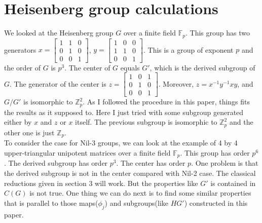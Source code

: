 \documentclass[conference]{IEEEtran}
\begin{document}
\section{Heisenberg group calculations}
We looked at the Heisenberg group $G$ over a finite field $\mathbb{F}_{p}$. This group has two generators $x=\begin{bmatrix}1&1&0\\0&1&0\\0&0&1\end{bmatrix}$, $y=\begin{bmatrix}1&0&0\\1&1&0\\0&0&1\end{bmatrix}$. This is a group of exponent $p$ and the order of $G$ is $p^{3}$. The center of $G$ equals $G'$, which is the derived subgroup of $G$. The generator of the center is $z=\begin{bmatrix}1&0&1\\0&1&0\\0&0&1\end{bmatrix}$. Moreover, $z=x^{-1}y^{-1}xy$, and $G/G'$ is isomorphic to $\mathbb{Z}_{p}^{2}$. As I followed the procedure in this paper, things fits the results as it supposed to. Here I just tried with some subgroup generated either by $x$ and $z$ or $x$ itself. The previous subgroup is isomorphic to $\mathbb{Z}_{p}^{2}$ and the other one is just $\mathbb{Z}_{p}$.\\

To consider the case for Nil-3 groups, we can look at the example of 4 by 4 upper-triangular unipotent matrices over a finite field $\mathbb{F}_{p}$. This group has order $p^{6}$. The derived subgroup has order $p^{3}$. The center has order $p$. One problem is that the derived subgroup is not in the center compared with Nil-2 case. The classical reductions given in section 3 will work. But the properties like $G'$ is contained in $C(G)$ is not true. One thing we can do next is to find some similar properties that is parallel to those maps($\phi_{j}$) and subgroups(like $HG'$) constructed in this paper.



%
%
\end{document}
